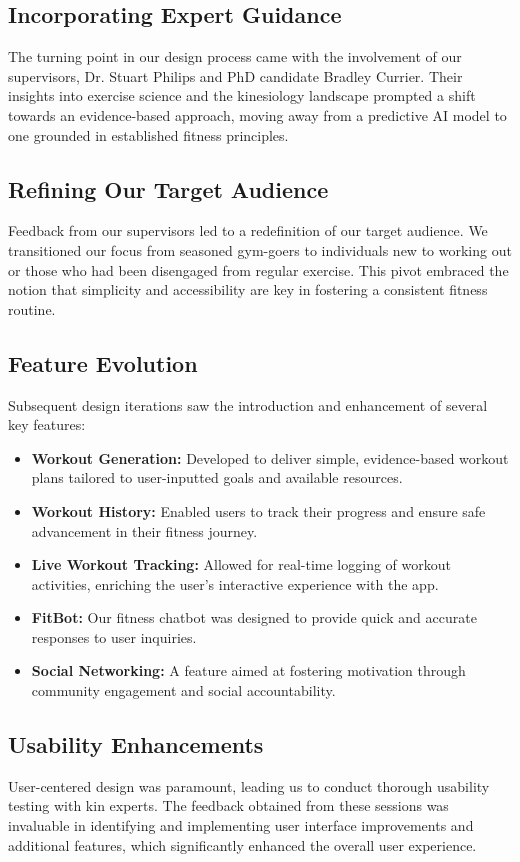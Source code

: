\documentclass{article}
\begin{document}
\subsection{Incorporating Expert Guidance}
The turning point in our design process came with the involvement of our supervisors, Dr. Stuart Philips and PhD candidate Bradley Currier. Their insights into exercise science and the kinesiology landscape prompted a shift towards an evidence-based approach, moving away from a predictive AI model to one grounded in established fitness principles.

\subsection{Refining Our Target Audience}
Feedback from our supervisors led to a redefinition of our target audience. We transitioned our focus from seasoned gym-goers to individuals new to working out or those who had been disengaged from regular exercise. This pivot embraced the notion that simplicity and accessibility are key in fostering a consistent fitness routine.

\subsection{Feature Evolution}
Subsequent design iterations saw the introduction and enhancement of several key features:

\begin{itemize}
  \item \textbf{Workout Generation:} Developed to deliver simple, evidence-based workout plans tailored to user-inputted goals and available resources.
  \item \textbf{Workout History:} Enabled users to track their progress and ensure safe advancement in their fitness journey.
  \item \textbf{Live Workout Tracking:} Allowed for real-time logging of workout activities, enriching the user's interactive experience with the app.
  \item \textbf{FitBot:} Our fitness chatbot was designed to provide quick and accurate responses to user inquiries.
  \item \textbf{Social Networking:} A feature aimed at fostering motivation through community engagement and social accountability.
\end{itemize}

\subsection{Usability Enhancements}
User-centered design was paramount, leading us to conduct thorough usability testing with kin experts. The feedback obtained from these sessions was invaluable in identifying and implementing user interface improvements and additional features, which significantly enhanced the overall user experience.
\end{document}
